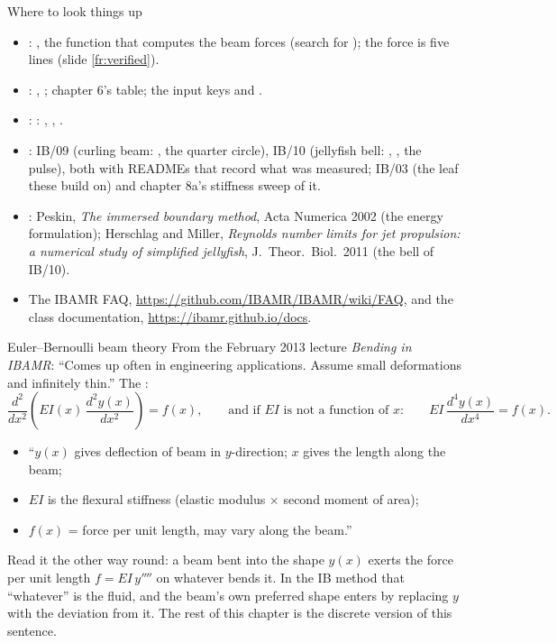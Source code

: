 \documentclass[aspectratio=169,11pt]{beamer}
\begin{document}
\begin{frame}{Where to look things up}
\label{fr:lookup}
\small
\begin{itemize}
  \item {}: , the function that computes the beam forces (search for ); the force is five lines (slide \ref{fr:verified}).
  \item {}: , ; chapter 6's table; the input keys  and .
  \item {}: : , , .
  \item {}: IB/09 (curling beam: , the quarter circle), IB/10 (jellyfish bell: , , the pulse), both with READMEs that record what was measured; IB/03 (the leaf these build on) and chapter 8a's stiffness sweep of it.
  \item {}: Peskin, \emph{The immersed boundary method}, Acta Numerica 2002 (the energy formulation); Herschlag and Miller, \emph{Reynolds number limits for jet propulsion: a numerical study of simplified jellyfish}, J.\ Theor.\ Biol.\ 2011 (the bell of IB/10).
  \item The IBAMR FAQ, \url{https://github.com/IBAMR/IBAMR/wiki/FAQ}, and the class documentation, \url{https://ibamr.github.io/docs}.
\end{itemize}
\end{frame}

\begin{frame}{Euler--Bernoulli beam theory}
\label{fr:eb}
\small From the February 2013 lecture \emph{Bending in IBAMR}: ``Comes up often in engineering applications. Assume small deformations and infinitely thin.'' The :
\[
  \frac{d^2}{dx^2}\!\left(EI(x)\,\frac{d^2 y(x)}{dx^2}\right) = f(x), \qquad\text{and if $EI$ is not a function of $x$:}\qquad EI\,\frac{d^4 y(x)}{dx^4} = f(x).
\]
\begin{itemize}
  \item ``$y(x)$ gives deflection of beam in $y$-direction; $x$ gives the length along the beam;
  \item $EI$ is the flexural stiffness (elastic modulus $\times$ second moment of area);
  \item $f(x)$ = force per unit length, may vary along the beam.''
\end{itemize}
\vspace{1mm}
\begin{punchbox}
\small Read it the other way round: a beam bent into the shape $y(x)$ exerts the force per unit length $f = EI\,y''''$ on whatever bends it. In the IB method that ``whatever'' is the fluid, and the beam's own preferred shape enters by replacing $y$ with the deviation from it. The rest of this chapter is the discrete version of this sentence.
\end{punchbox}
\end{frame}
\end{document}
